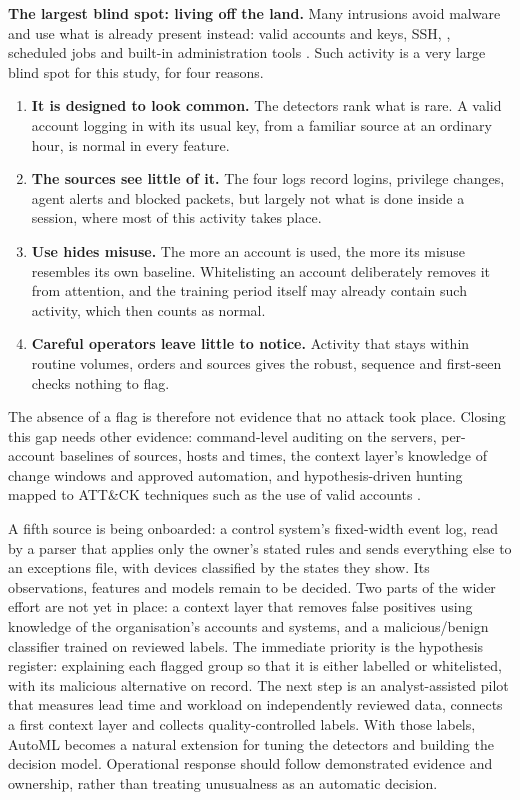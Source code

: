 \documentclass[11pt,a4paper]{article}
\newcommand{\tok}[1]{\texttt{\detokenize{#1}}}
\begin{document}
\textbf{The largest blind spot: living off the land.} Many intrusions avoid malware and use what is already present instead: valid accounts and keys, SSH, \tok{su}, scheduled jobs and built-in administration tools \cite{ref27}. Such activity is a very large blind spot for this study, for four reasons.
\begin{enumerate}[leftmargin=*]
\item \textbf{It is designed to look common.} The detectors rank what is rare. A valid account logging in with its usual key, from a familiar source at an ordinary hour, is normal in every feature.
\item \textbf{The sources see little of it.} The four logs record logins, privilege changes, agent alerts and blocked packets, but largely not what is done inside a session, where most of this activity takes place.
\item \textbf{Use hides misuse.} The more an account is used, the more its misuse resembles its own baseline. Whitelisting an account deliberately removes it from attention, and the training period itself may already contain such activity, which then counts as normal.
\item \textbf{Careful operators leave little to notice.} Activity that stays within routine volumes, orders and sources gives the robust, sequence and first-seen checks nothing to flag.
\end{enumerate}
The absence of a flag is therefore not evidence that no attack took place. Closing this gap needs other evidence: command-level auditing on the servers, per-account baselines of sources, hosts and times, the context layer's knowledge of change windows and approved automation, and hypothesis-driven hunting mapped to ATT\&CK techniques such as the use of valid accounts \cite{ref10}.

A fifth source is being onboarded: a control system's fixed-width event log, read by a parser that applies only the owner's stated rules and sends everything else to an exceptions file, with devices classified by the states they show. Its observations, features and models remain to be decided. Two parts of the wider effort are not yet in place: a context layer that removes false positives using knowledge of the organisation's accounts and systems, and a malicious/benign classifier trained on reviewed labels. The immediate priority is the hypothesis register: explaining each flagged group so that it is either labelled or whitelisted, with its malicious alternative on record. The next step is an analyst-assisted pilot that measures lead time and workload on independently reviewed data, connects a first context layer and collects quality-controlled labels. With those labels, AutoML becomes a natural extension for tuning the detectors and building the decision model. Operational response should follow demonstrated evidence and ownership, rather than treating unusualness as an automatic decision.
\end{document}
